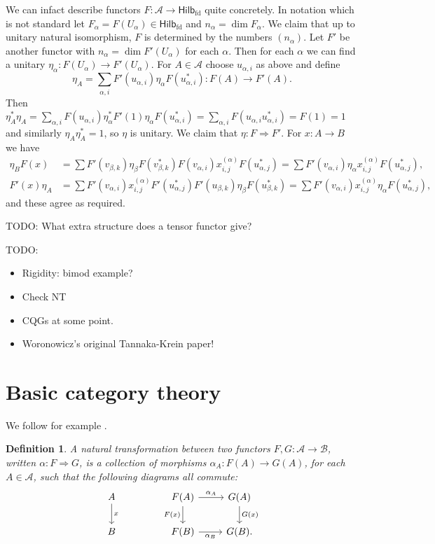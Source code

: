 \documentclass[a4paper,11pt]{article}
\theoremstyle{plain}
\newtheorem{definition}[proposition]{Definition}
\theoremstyle{remark}
\newcommand{\mc}[1]{\mathcal{#1}}
\newcommand{\catHilbFD}{\textsf{Hilb}_{\text{fd}}}
\begin{document}
We can infact describe functors $F\colon \mc A \to \catHilbFD$ quite concretely.  In notation which is not standard let $F_\alpha = F(U_\alpha) \in \catHilbFD$ and $n_\alpha = \dim F_\alpha$.  We claim that up to unitary natural isomorphism, $F$ is determined by the numbers $(n_\alpha)$.  Let $F'$ be another functor with $n_\alpha = \dim F'(U_\alpha)$ for each $\alpha$.  Then for each $\alpha$ we can find a unitary $\eta_\alpha \colon F(U_\alpha) \to F'(U_\alpha)$.  For $A\in\mc A$ choose $u_{\alpha,i}$ as above and define
\[ \eta_A = \sum_{\alpha,i} F'(u_{\alpha,i}) \eta_\alpha F(u_{\alpha,i}^*) \colon F(A) \to F'(A). \]
Then $\eta_A^*\eta_A = \sum_{\alpha,i} F(u_{\alpha,i}) \eta_\alpha^* F'(1) \eta_\alpha F(u^*_{\alpha,i}) = \sum_{\alpha,i} F(u_{\alpha,i}u_{\alpha,i}^*) = F(1) = 1$ and similarly $\eta_A \eta_A^*=1$, so $\eta$ is unitary.  We claim that $\eta \colon F \Rightarrow F'$.  For $x \colon A\to B$ we have
\begin{align*}
\eta_B F(x)
&= \sum F'(v_{\beta,k}) \eta_\beta F(v_{\beta,k}^*) F(v_{\alpha,i}) x^{(\alpha)}_{i,j} F(u^*_{\alpha,j})
= \sum F'(v_{\alpha,i}) \eta_\alpha x^{(\alpha)}_{i,j} F(u^*_{\alpha,j}), \\
F'(x) \eta_A
&= \sum F'(v_{\alpha,i}) x^{(\alpha)}_{i,j} F'(u^*_{\alpha,j}) F'(u_{\beta,k}) \eta_\beta F(u_{\beta,k}^*)
= \sum F'(v_{\alpha,i}) x^{(\alpha)}_{i,j} \eta_\alpha F(u_{\alpha,j}^*),
\end{align*}
and these agree as required.

TODO: What extra structure does a tensor functor give?


\bigskip
TODO:
\begin{itemize}
  \item Rigidity: bimod example?
  \item Check NT
  \item CQGs at some point.
  \item Woronowicz's original Tannaka-Krein paper!
\end{itemize}





\clearpage
\appendix
\section{Basic category theory}\label{sec:cat}

We follow for example \cite{Leinster_BasicCatTheory}.

\begin{definition}\label{defn:natural_transformation}
A \emph{natural transformation} between two functors $F,G \colon \mc A \to \mc B$, written $\alpha \colon F \Rightarrow G$, is a collection of morphisms $\alpha_A \colon F(A) \to G(A)$, for each $A\in\mc A$, such that the following diagrams all commute:
\[ \begin{tikzcd}
  A \arrow[d, "x"] &&  F(A) \arrow[r, "\alpha_A"] \arrow[d, "F(x)"'] & G(A) \arrow[d, "G(x)"] \\
  B &&  F(B) \arrow[r, "\alpha_B"'] & G(B).
\end{tikzcd} \]
\end{definition}
\end{document}

